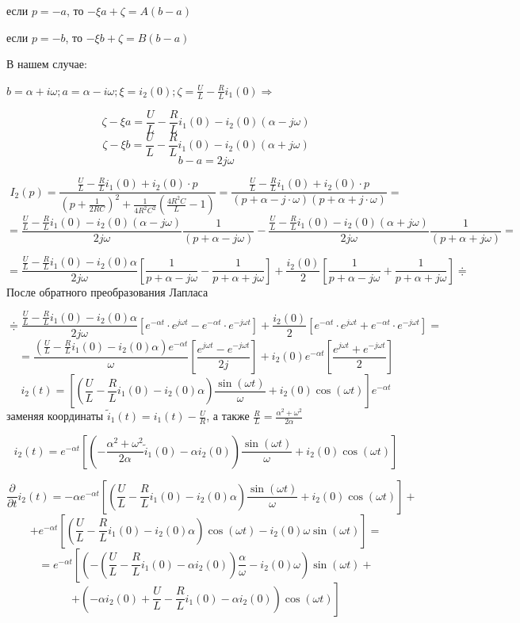 \documentclass[a4paper,12pt]{article}
\begin{document}
если $p=-a$, то $-\xi a + \zeta = A(b-a)$

если $p=-b$, то $-\xi b + \zeta = B(b-a)$

В нашем случае:

$b=\alpha+i\omega; a = \alpha-i\omega; \xi = i_2(0); \zeta=\frac{U}{L}-\frac{R}{L} i_1(0) \Rightarrow$ 

$$
\zeta - \xi a = \frac{U}{L}-\frac{R}{L} i_1(0) - i_2(0)(\alpha-j\omega)
$$
$$
\zeta-\xi b = \frac{U}{L}-\frac{R}{L} i_1(0) - i_2(0)(\alpha + j\omega)
$$
$$
b-a = 2j\omega
$$

$$
I_2(p) = \frac{\frac{U}{L}- \frac{R}{L}i_1(0) + i_2(0)\cdot p}
{\left(p + \frac{1}{2RC}\right)^2 + \frac{1}{4R^2C^2}\left(\frac{4R^2C}{L} - 1\right)}=
\frac{\frac{U}{L}- \frac{R}{L}i_1(0) + i_2(0)\cdot p}{(p + \alpha - j\cdot\omega)(p+\alpha+j\cdot\omega)} =
$$
$$
=\frac{\frac{U}{L}-\frac{R}{L} i_1(0) - i_2(0)(\alpha-j\omega)}{2j\omega}
\frac{1}{(p + \alpha - j\omega)} -
\frac{\frac{U}{L}-\frac{R}{L} i_1(0) - i_2(0)(\alpha + j\omega)}{2j\omega}
\frac{1}{(p + \alpha + j\omega)}=
$$

$$
=\frac{\frac{U}{L}-\frac{R}{L} i_1(0) - i_2(0)\alpha}{2j\omega}
\left[\frac{1}{p+\alpha-j\omega} - \frac{1}{p+\alpha+j\omega} \right] + 
\frac{i_2(0)}{2}\left[\frac{1}{p+\alpha-j\omega} + \frac{1}{p+\alpha+j\omega} \right]
\doteqdot
$$
После обратного преобразования Лапласа

$$
\doteqdot
\frac{\frac{U}{L}-\frac{R}{L} i_1(0) - i_2(0)\alpha}{2j\omega}
\left[e^{-\alpha t}\cdot e^{j\omega t} - e^{-\alpha t}\cdot e^{-j\omega t}\right]
+\frac{i_2(0)}{2}\left[e^{-\alpha t}\cdot e^{j\omega t} + e^{-\alpha t}\cdot e^{-j\omega t}\right] =
$$
$$
= \frac{\left(\frac{U}{L}-\frac{R}{L} i_1(0) - i_2(0)\alpha\right)e^{-\alpha t}}{\omega} 
\left[\frac{e^{j\omega t} -  e^{-j \omega t}}{2j}\right] 
+ i_2(0) e^{-\alpha t} \left[\frac{e^{j\omega t} +  e^{-j \omega t}}{2}\right]
$$
$$
i_2(t) = \left[ \left(\frac{U}{L}-\frac{R}{L} i_1(0) - i_2(0)\alpha\right)\frac{\sin(\omega t)}{\omega}
+ i_2(0)\cos(\omega t) \right] e^{-\alpha t}
$$
заменяя координаты ${\displaystyle \tilde{i}_1(t) = i_1(t) - \frac{U}{R}}$, 
а также ${\displaystyle \frac{R}{L} = \frac{\alpha^2+\omega^2}{2\alpha}}$

$$
i_2(t) = e^{-\alpha t}\left[ \left(-\frac{\alpha^2+\omega^2}{2\alpha} \tilde{i}_1(0) - \alpha i_2(0)\right) 
\frac{\sin(\omega t)}{\omega} + i_2(0)\cos(\omega t)\right]
$$


$$
\frac{\partial}{\partial t}i_2(t) = -\alpha e^{-\alpha t}
\left[ \left(\frac{U}{L}-\frac{R}{L} i_1(0) - i_2(0)\alpha\right)\frac{\sin(\omega t)}{\omega}
+ i_2(0)\cos(\omega t) \right] +
$$
$$
+e^{-\alpha t} \left[\left(\frac{U}{L}-\frac{R}{L} i_1(0) - i_2(0)\alpha\right)\cos(\omega t) 
- i_2(0)\omega \sin(\omega t)\right] =
$$
$$
= e^{-\alpha t} \left[\left(-\left(\frac{U}{L} - \frac{R}{L}i_1(0) - \alpha i_2(0)\right) 
\frac{\alpha}{\omega} - i_2(0)\omega\right)\sin(\omega t)\right. +
$$
$$
+\left.\left(-\alpha i_2(0) + \frac{U}{L} - \frac{R}{L}i_1(0) - \alpha i_2(0) \right)\cos(\omega t)
\right]
$$
\end{document}
